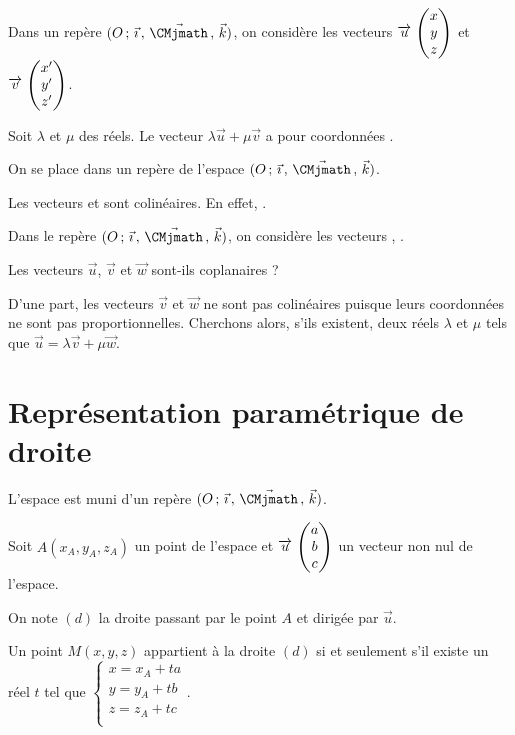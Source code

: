 \documentclass[11pt,fleqn, openany]{book} %
\begin{document}
\begin{proposition}Dans un repère  $\Oijk$, on considère les vecteurs $\renewcommand{\arraystretch}{1}\coorde{u}{x}{y}{z}$ et $\renewcommand{\arraystretch}{1}\coorde{v}{x'}{y'}{z'}$. 

Soit $\lambda$ et $\mu$ des réels. Le vecteur $\lambda \vec u + \mu \vec v$ a pour coordonnées \renewcommand{\arraystretch}{1}.\end{proposition}

\begin{example}On se place dans un repère de l'espace $\Oijk$. 

Les vecteurs \renewcommand{\arraystretch}{1} et \renewcommand{\arraystretch}{1} sont colinéaires. En effet, .\end{example}

\begin{example} Dans le repère  $\Oijk$, on considère les vecteurs \renewcommand{\arraystretch}{1} \renewcommand{\arraystretch}{1}, \renewcommand{\arraystretch}{1} . 

Les vecteurs $\vec u$, $\vec v$ et $\vec w$ sont-ils coplanaires ? 

D'une part, les vecteurs $\vec v$ et $\vec w$ ne sont pas colinéaires puisque leurs coordonnées ne sont pas proportionnelles.
\vskip20pt
Cherchons alors, s'ils existent, deux réels $\lambda$ et $\mu$ tels que $\vec u = \lambda \vec v + \mu \vec w$. 

\vskip180pt

\end{example}


\section{Représentation paramétrique de droite}

\begin{proposition}L'espace est muni d'un repère $\Oijk$.

Soit $A (x_A,y_A,z_A)$ un point de l'espace et $\renewcommand{\arraystretch}{1}\coorde{u}{a}{b}{c}$ un vecteur non nul de l'espace.

On note $(d)$ la droite passant par le point $A$ et dirigée par $\vec u$.

Un point $M(x,y,z)$ appartient à la droite $(d)$ si et seulement s'il existe un réel $t$ tel que $\renewcommand{\arraystretch}{1}\left\{ \begin{array}{l}x=x_A+ta \\ y=y_A+tb \\ z = z_A + tc \\

\end{array}\right.$.
\end{proposition}
\end{document}
